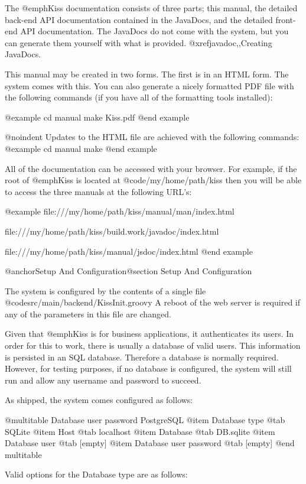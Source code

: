 The @emph{Kiss} documentation consists of three parts; this manual,
the detailed back-end API documentation contained in the JavaDocs, and
the detailed front-end API documentation.  The JavaDocs do not come
with the system, but you can generate them yourself with what is
provided.  @xref{javadoc,,Creating JavaDocs}.

This manual may be created in two forms.  The first is in an HTML
form.  The system comes with this.  You can also generate a nicely
formatted PDF file with the following commands (if you have all of the
formatting tools installed):

@example
cd manual
make Kiss.pdf
@end example

@noindent
Updates to the HTML file are achieved with the following commands:
@example
cd manual
make
@end example

All of the documentation can be accessed with your browser.  For
example, if the root of @emph{Kiss} is located at
@code{/my/home/path/kiss} then you will be able to access the three
manuals at the following URL's:

@example
file:///my/home/path/kiss/manual/man/index.html

file:///my/home/path/kiss/build.work/javadoc/index.html

file:///my/home/path/kiss/manual/jsdoc/index.html
@end example

@anchor{Setup And Configuration}@section Setup And Configuration

The system is configured by the contents of a single file
@code{src/main/backend/KissInit.groovy} A reboot of the web server
is required if any of the parameters in this file are changed.

Given that @emph{Kiss} is for business applications, it authenticates its
users.  In order for this to work, there is usually a database of valid
users.  This information is persisted in an SQL database.  Therefore a
database is normally required.  However, for testing purposes, if no
database is configured, the system will still run and allow any
username and password to succeed.

As shipped, the system comes configured as follows:

@multitable {Database user password} {PostgreSQL} 
@item Database type
@tab SQLite
@item Host
@tab localhost
@item Database
@tab DB.sqlite
@item Database user
@tab [empty]
@item Database user password
@tab [empty]
@end multitable

Valid options for the Database type are as follows:

